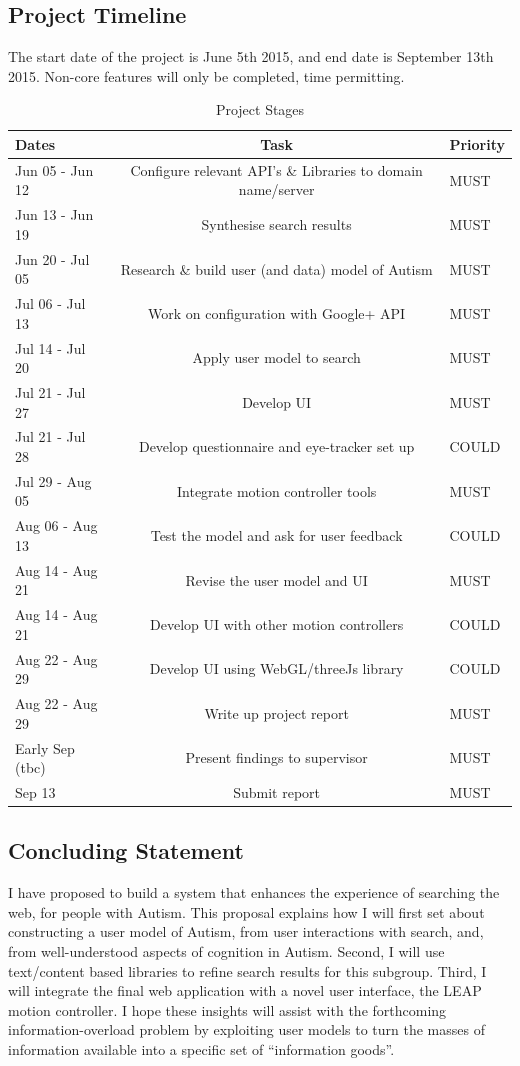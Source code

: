 \documentclass[a4paper, 10pt]{article}
\begin{document}
\subsection{Project Timeline}\label{plan}
The start date of the project is June 5th 2015, and end date is September 13th 2015. Non-core features will only be completed, time permitting.
\begin{table}[H]
\caption{Project Stages} 
\centering
\begin{tabular}{ | L |c| L |}
\hline\hline 
Dates & Task & Priority\\ [0.5ex]
\hline 
Jun 05 - Jun 12 & Configure relevant API's \& Libraries to domain name/server & MUST\\
\hline 
Jun 13 - Jun 19 & Synthesise search results & MUST\\
\hline 
Jun 20 - Jul 05 & Research \& build user (and data) model of Autism & MUST\\
\hline 
Jul 06 - Jul 13 & Work on configuration with Google+ API & MUST\\
\hline 
Jul 14 - Jul 20 & Apply user model to search& MUST\\ 
\hline 
Jul 21 - Jul 27 & Develop UI & MUST\\
\hline 
Jul 21 - Jul 28 & Develop questionnaire and eye-tracker set up & COULD\\
\hline 
Jul 29 - Aug 05 & Integrate motion controller tools& MUST\\
\hline 
Aug 06 - Aug 13 & Test the model and ask for user feedback & COULD\\
\hline 
Aug 14 - Aug 21 & Revise the user model and UI & MUST\\
\hline 
Aug 14 - Aug 21 & Develop UI with other motion controllers & COULD\\
\hline 
Aug 22 - Aug 29 & Develop UI using WebGL/threeJs library & COULD\\
\hline 
Aug 22 - Aug 29 & Write up project report & MUST\\ 
\hline 
Early Sep (tbc) & Present findings to supervisor & MUST\\
\hline 
Sep 13 & Submit report & MUST\\[0.5ex]
\hline
\end{tabular}
\label{stages} 
\end{table}

\subsection{Concluding Statement}\label{future}
I have proposed to build a system that enhances the experience of searching the web, for people with Autism. This proposal explains how I will first set about constructing a user model of Autism, from user interactions with search, and, from well-understood aspects of cognition in Autism. Second, I will use text/content based libraries to refine search results for this subgroup. Third, I will integrate the final web application with a novel user interface, the LEAP motion controller. I hope these insights will assist with the forthcoming information-overload problem by exploiting user models to turn the masses of information available into a specific set of “information goods”.
\end{document}
